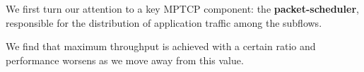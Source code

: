 We first turn our attention to
a key MPTCP component: the \textbf{packet-scheduler},
responsible for the distribution of application traffic among the
subflows. 
\begin{comment}
\begin{figure}[t]
    \centering
    \subfigure[Throughput vs. packet ratio.] {
        \texttt{[image: contention/ratio\_tput\_bar.pdf]}
        \label{fig:ratio_tput}
    }\hfill
    \subfigure[Delay (\emph{ofo-queue}): $Pkts_{ad}$.] {
        \texttt{[image: contention/ratio\_ofo\_delay.pdf]}
        \label{fig:ratio_tput_ofo_delay}
    }%
    \vspace{-0.2in}
    \caption{Impact of packet scheduling decisions.}
    \vspace{-0.25in}
\end{figure}
Fig.~\ref{fig:ratio_tput} plots the MPTCP throughput against the
number of packets assigned to the 802.11ad subflow ($Pkts_{ad}$) out
of every 100 packets.
\end{comment} 
We find that maximum throughput
is achieved with 
a certain ratio and performance worsens as we
move away from this value.

